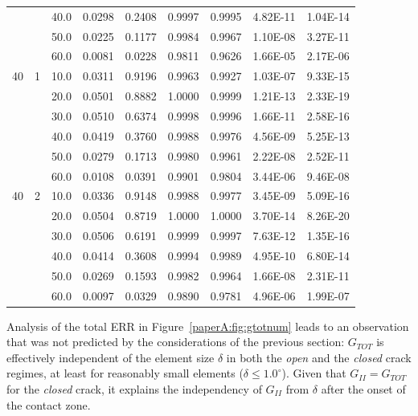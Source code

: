 \begin{table}[!h]
\begin{tabular}{ccccccccc}
&&		\small40.0&	\small0.0298&\small	0.2408&\small	0.9997&\small	0.9995&\small	4.82E-11&\small	1.04E-14\\
&&		\small50.0&	\small0.0225&\small	0.1177&\small	0.9984&\small	0.9967&\small	1.10E-08&\small	3.27E-11\\
&&		\small60.0&	\small0.0081&\small	0.0228&\small	0.9811&\small	0.9626&\small	1.66E-05&\small	2.17E-06\\
\midrule
\small40&\small1&	\small10.0&	\small0.0311&	\small0.9196&	\small0.9963&	\small0.9927&	\small1.03E-07&	\small9.33E-15\\
&&		\small20.0&	\small0.0501&\small	0.8882&\small	1.0000&\small	0.9999&\small	1.21E-13&\small	2.33E-19\\
&&		\small30.0&	\small0.0510&\small	0.6374&\small	0.9998&\small	0.9996&\small	1.66E-11&\small	2.58E-16\\
&&		\small40.0&	\small0.0419&\small	0.3760&\small	0.9988&\small	0.9976&\small	4.56E-09&\small	5.25E-13\\
&&		\small50.0&	\small0.0279&\small	0.1713&\small	0.9980&\small	0.9961&\small	2.22E-08&\small	2.52E-11\\
&&		\small60.0&	\small0.0108&\small	0.0391&\small	0.9901&\small	0.9804&\small	3.44E-06&\small	9.46E-08\\
\midrule
\small40&\small2&	\small10.0&	\small0.0336&	\small0.9148&	\small0.9988&	\small0.9977&	\small3.45E-09&	\small5.09E-16\\
&&		\small20.0&	\small0.0504&\small	0.8719&\small	1.0000&\small	1.0000&\small	3.70E-14&\small	8.26E-20\\
&&		\small30.0&	\small0.0506&\small	0.6191&\small	0.9999&\small	0.9997&\small	7.63E-12&\small	1.35E-16\\
&&		\small40.0&	\small0.0414&\small	0.3608&\small	0.9994&\small	0.9989&\small	4.95E-10&\small	6.80E-14\\
&&		\small50.0&	\small0.0269&\small	0.1593&\small	0.9982&\small	0.9964&\small	1.66E-08&\small	2.31E-11\\
&&		\small60.0&	\small0.0097&\small	0.0329&\small	0.9890&\small	0.9781&\small	4.96E-06&\small	1.99E-07\\
\end{tabular}
\end{table}

Analysis of the total ERR in Figure~\ref{paperA:fig:gtotnum} leads to an observation that was not predicted by the considerations of the previous section: $G_{TOT}$ is effectively independent of the element size $\delta$ in both the \emph{open} and the \emph{closed} crack regimes, at least for reasonably small elements ($\delta\leq1.0^{\circ}$). Given that $G_{II}=G_{TOT}$ for the \emph{closed} crack, it explains the independency of $G_{II}$ from $\delta$ after the onset of the contact zone.

